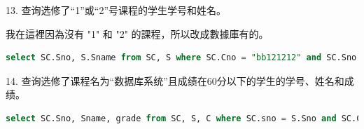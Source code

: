 \documentclass[12pt, a4paper]{report}
\begin{document}
13. 查询选修了“1”或“2”号课程的学生学号和姓名。

我在這裡因為沒有 "1" 和 "2" 的課程，所以改成數據庫有的。\\


\begin{lstlisting}[language=SQL]
    select SC.Sno, S.Sname from SC, S where SC.Cno = "bb121212" and SC.Sno union select SC.Sno, S.Sname from SC, S where SC.Cno = "bb131313" and SC.Sno = S.Sno;
\end{lstlisting}

\begin{figure}[H] %
    \centering %
\end{figure}

14. 查询选修了课程名为“数据库系统”且成绩在60分以下的学生的学号、姓名和成绩。\\

\begin{lstlisting}[language=SQL]
    select SC.Sno, Sname, grade from SC, S, C where SC.sno = S.Sno and SC.Cno = C.Cno and Cname = 'SSD7' and grade < 60;
\end{lstlisting}

\begin{figure}[H] %
    \centering %
\end{figure}
\end{document}
